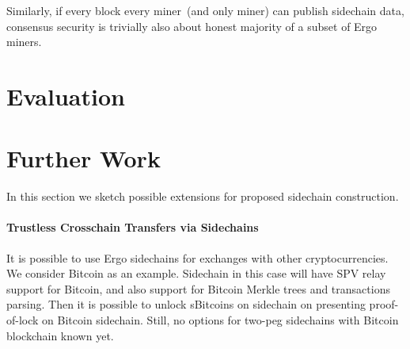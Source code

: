 \documentclass{article}   %
\newcommand{\authnote}[2]{\marginpar{\parbox{\marginparwidth}{\tiny %
  \textsf{#1 {\textcolor{blue}{notes: #2}}}}}%
  \textcolor{blue}{\textbf{\dag}}}
\newcommand{\authnote}[2]{
  \textsf{#1 \textcolor{blue}{: #2}}}
\newcommand{\authnote}[2]{}
\newcommand{\knote}[1]{{\authnote{\textcolor{green}{kushti notes}}{#1}}}
\begin{document}
Similarly, if every block every miner~(and only miner) can publish sidechain data, consensus security is
trivially also about honest majority of a subset of Ergo miners.

\section{Evaluation}

\knote{Fill with tests data}

\section{Further Work}

In this section we sketch possible extensions for proposed sidechain construction.

\paragraph{Trustless Crosschain Transfers via Sidechains}

It is possible to use Ergo sidechains for exchanges with other cryptocurrencies. We consider Bitcoin as an
example. Sidechain in this case will have SPV relay support for Bitcoin, and also support for Bitcoin Merkle trees and
transactions parsing. Then it is possible to unlock sBitcoins on sidechain on presenting proof-of-lock on Bitcoin
sidechain. Still, no options for two-peg sidechains with Bitcoin blockchain known yet.

\newpage

 
\end{document}
